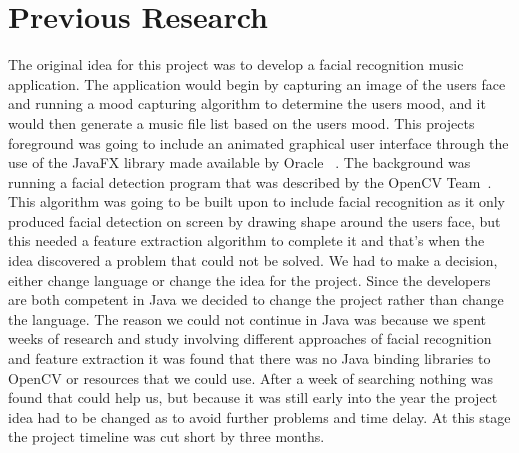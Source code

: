 \chapter*{Previous Research}
The original idea for this project was to develop a facial recognition music application. The application would begin by capturing an image of the users face and running a mood capturing algorithm to determine the users mood, and it would then generate a music file list based on the users mood. This projects foreground was going to include an animated graphical user interface through the use of the JavaFX library made available by Oracle ~\cite{javafx}. The background was running a facial detection program that was described by the OpenCV Team~\cite{opencv}. This algorithm was going to be built upon to include facial recognition as it only produced facial detection on screen by drawing shape around the users face, but this needed a feature extraction algorithm to complete it and that's when the idea discovered a problem that could not be solved. We had to make a decision,  either change language or change the idea for the project. Since the developers are both competent in Java we decided to change the project rather than change the language. The reason we could not continue in Java was because we spent weeks of research and study involving different approaches of facial recognition and feature extraction it was found that there was no Java binding libraries to OpenCV or resources that we could use. After a week of searching nothing was found that could help us, but because it was still early into the year the project idea had to be changed as to avoid further problems and time delay. At this stage the project timeline was cut short by three months.

